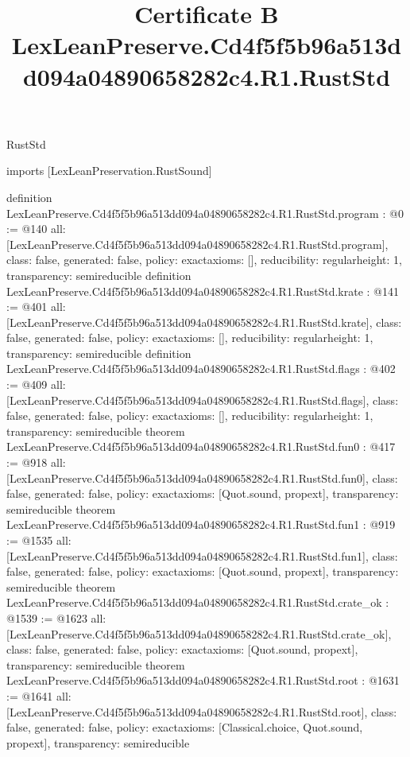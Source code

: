 \begin{lexlean}{RustStd}
\title{Certificate B LexLeanPreserve.Cd4f5f5b96a513dd094a04890658282c4.R1.RustStd}
\begin{coremodule}
imports [LexLeanPreservation.RustSound]

definition LexLeanPreserve.Cd4f5f5b96a513dd094a04890658282c4.R1.RustStd.program : @0 := @140 {
  all: [LexLeanPreserve.Cd4f5f5b96a513dd094a04890658282c4.R1.RustStd.program],
  class: false,
  generated: false,
  policy: exact{axioms: []},
  reducibility: regular{height: 1},
  transparency: semireducible
}
definition LexLeanPreserve.Cd4f5f5b96a513dd094a04890658282c4.R1.RustStd.krate : @141 := @401 {
  all: [LexLeanPreserve.Cd4f5f5b96a513dd094a04890658282c4.R1.RustStd.krate],
  class: false,
  generated: false,
  policy: exact{axioms: []},
  reducibility: regular{height: 1},
  transparency: semireducible
}
definition LexLeanPreserve.Cd4f5f5b96a513dd094a04890658282c4.R1.RustStd.flags : @402 := @409 {
  all: [LexLeanPreserve.Cd4f5f5b96a513dd094a04890658282c4.R1.RustStd.flags],
  class: false,
  generated: false,
  policy: exact{axioms: []},
  reducibility: regular{height: 1},
  transparency: semireducible
}
theorem LexLeanPreserve.Cd4f5f5b96a513dd094a04890658282c4.R1.RustStd.fun0 : @417 := @918 {
  all: [LexLeanPreserve.Cd4f5f5b96a513dd094a04890658282c4.R1.RustStd.fun0],
  class: false,
  generated: false,
  policy: exact{axioms: [Quot.sound, propext]},
  transparency: semireducible
}
theorem LexLeanPreserve.Cd4f5f5b96a513dd094a04890658282c4.R1.RustStd.fun1 : @919 := @1535 {
  all: [LexLeanPreserve.Cd4f5f5b96a513dd094a04890658282c4.R1.RustStd.fun1],
  class: false,
  generated: false,
  policy: exact{axioms: [Quot.sound, propext]},
  transparency: semireducible
}
theorem LexLeanPreserve.Cd4f5f5b96a513dd094a04890658282c4.R1.RustStd.crate_ok : @1539 := @1623 {
  all: [LexLeanPreserve.Cd4f5f5b96a513dd094a04890658282c4.R1.RustStd.crate_ok],
  class: false,
  generated: false,
  policy: exact{axioms: [Quot.sound, propext]},
  transparency: semireducible
}
theorem LexLeanPreserve.Cd4f5f5b96a513dd094a04890658282c4.R1.RustStd.root : @1631 := @1641 {
  all: [LexLeanPreserve.Cd4f5f5b96a513dd094a04890658282c4.R1.RustStd.root],
  class: false,
  generated: false,
  policy: exact{axioms: [Classical.choice, Quot.sound, propext]},
  transparency: semireducible
}


\end{coremodule}
\end{lexlean}
